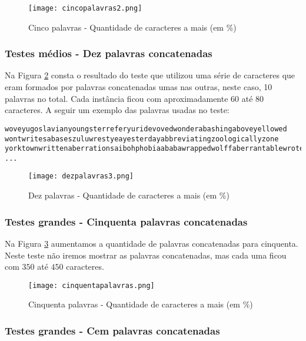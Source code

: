 \documentclass[12pt]{article}
\begin{document}
    \begin{figure}[h!]
        \centering
        \texttt{[image: cincopalavras2.png]}
        \caption{Cinco palavras - Quantidade de caracteres a mais (em \%)}
        \label{cincopalavras}
    \end{figure}

\subsubsection{Testes médios - Dez palavras concatenadas}
\label{medio10}

Na Figura \ref{dezpalavras} consta o resultado do teste que utilizou uma série de caracteres que eram formados por palavras concatenadas umas nas outras, neste caso, 10 palavras no total. Cada instância ficou com aproximadamente $60$ até $80$ caracteres. A seguir um exemplo das palavras usadas no teste:

\begin{verbatim}
woveyugoslavianyoungsterreferyuridevovedwonderabashingaboveyellowed
wontwritesabaseszuluwrestyeayesterdayabbreviatingzoologicallyzone
yorktownwrittenaberrationsaibohphobiaababawrappedwolffaberrantablewrote
...
\end{verbatim}


    \begin{figure}[h!]
        \centering
        \texttt{[image: dezpalavras3.png]}
        \caption{Dez palavras - Quantidade de caracteres a mais (em \%)}
        \label{dezpalavras}
    \end{figure}


\subsubsection{Testes grandes - Cinquenta palavras concatenadas}
\label{grande50}

Na Figura \ref{cinquentapalavras} aumentamos a quantidade de palavras concatenadas para cinquenta. Neste teste não iremos mostrar as palavras concatenadas, mas cada uma ficou com $350$ até $450$ caracteres.

    \begin{figure}[h!]
        \centering
        \texttt{[image: cinquentapalavras.png]}
        \caption{Cinquenta palavras - Quantidade de caracteres a mais (em \%)}
        \label{cinquentapalavras}
    \end{figure}

\subsubsection{Testes grandes - Cem palavras concatenadas}
\label{grande100}
\end{document}
